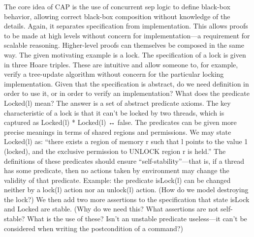 The core idea of CAP is the use of concurrent sep logic to define black-box behavior,
  allowing correct black-box composition without knowledge of the details.
Again, it separates specification from implementation.
This allows proofs to be made at high levels without concern for implementation---a requirement for scalable reasoning.
Higher-level proofs can themselves be composed in the same way.
The given motivating example is a lock.
The specification of a lock is given in three Hoare triples.
These are intuitive and allow someone to, for example, verify a tree-update algorithm without concern for the particular locking implementation.
Given that the specification is abstract, do we need definition in order to use it, or in order to verify an implementation?
What does the predicate Locked(l) mean?
The answer is a set of abstract predicate axioms.
The key characteristic of a lock is that it can’t be locked by two threads,
  which is captured as
  Locked(l) * Locked(l) ↔ false.
The predicates can be given more precise meanings in terms of shared regions and permissions.
We may state Locked(l) as:
  \enquote{there exists a region of memory r such that l points to the value 1 (locked), and the exclusive permission to UNLOCK region r is held.}
The definitions of these predicates should ensure \enquote{self-stability}---that is,
  if a thread has some predicate,
  then no actions taken by environment may change the validity of that predicate.
Example: the predicate isLock(l) can be changed neither by a lock(l) action nor an unlock(l) action.
(How do we model destroying the lock?)
We then add two more assertions to the specification that state isLock and Locked are stable.
(Why do we need this?
What assertions are not self-stable?
What is the use of these?
Isn’t an unstable predicate useless---it can’t be considered when writing the postcondition of a command?)

